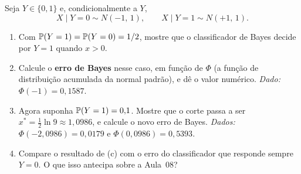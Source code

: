 \documentclass[11pt,a4paper]{article}
\begin{document}

\begin{exercicio}
Seja $Y\in\{0,1\}$ e, condicionalmente a $Y$,
\[
  X\mid Y=0 \sim N(-1,\,1), \qquad X\mid Y=1 \sim N(+1,\,1).
\]
\begin{enumerate}[label=(\alph*),leftmargin=1.1cm]
  \item Com $\mathbb{P}(Y=1)=\mathbb{P}(Y=0)=1/2$, mostre que o classificador de Bayes
        decide por $Y=1$ quando $x>0$.
  \item Calcule o \textbf{erro de Bayes} nesse caso, em função de $\Phi$ (a função
        de distribuição acumulada da normal padrão), e dê o valor numérico.
        \emph{Dado:} $\Phi(-1)=0{,}1587$.
  \item Agora suponha $\mathbb{P}(Y=1)=0{,}1$. Mostre que o corte passa a ser
        $x^\ast=\tfrac12\ln 9 \approx 1{,}0986$, e calcule o novo erro de Bayes.
        \emph{Dados:} $\Phi(-2{,}0986)=0{,}0179$ e $\Phi(0{,}0986)=0{,}5393$.
  \item Compare o resultado de (c) com o erro do classificador que responde
        sempre $Y=0$. O que isso antecipa sobre a Aula~08?
\end{enumerate}
\end{exercicio}
\end{document}
